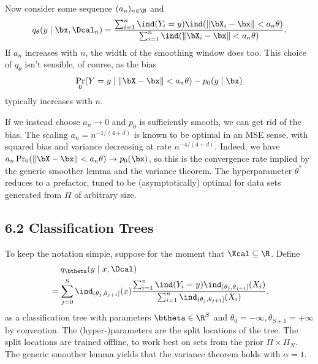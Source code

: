 \documentclass[aspectratio=169,10pt]{beamer}
\newcommand{\currentheading}{\ifx\insertsubsection\empty\insertsection\else\insertsubsection\fi}
\begin{document}
\begin{frame}{\currentheading}
Now consider some sequence $(a_n)_{n \in \N}$ and
\begin{align*}
	q_{\theta}(y \mid \bx, \Dcal_n)
	= \frac{\sum_{i = 1}^n \ind(Y_i = y) \ind(\| \bX_i - \bx\| < a_n\theta)}{\sum_{i = 1}^n \ind(\| \bX_i - \bx\| < a_n\theta)}.
\end{align*}
If $a_n$ increases with $n$, the width of the smoothing window does too. This choice of $q_{\theta}$ isn't sensible, of course, as the bias
\begin{align*}
	\Pr_0(Y = y \mid \| \bX - \bx\| < a_n\theta ) - p_0(y \mid \bx)
\end{align*}
typically increases with $n$.
\end{frame}

\begin{frame}{\currentheading}
If we instead choose $a_n \to 0$ and $p_0$ is sufficiently smooth, we can get rid of the bias. The scaling $a_n = n^{-1/(4 + d)}$ is known to be optimal in an MSE sense, with squared bias and variance decreasing at rate $n^{-4/(4 + d)}$. Indeed, we have $a_n\Pr_0(\| \bX - \bx\| < a_n\theta) \to p_0(\bx)$, so this is the convergence rate implied by the generic smoother lemma and the variance theorem. The hyperparameter $\theta^*$ reduces to a prefactor, tuned to be (asymptotically) optimal for data sets generated from $\Pi$ of arbitrary size.
\end{frame}

\subsection{6.2 Classification Trees}

\begin{frame}{\currentheading}
To keep the notation simple, suppose for the moment that $\Xcal \subseteq \R$. Define
\begin{align*}
	&\quad \; q_{\btheta}(y \mid x, \Dcal) \\
	&= \sum_{j = 0}^{S}  \ind_{(\theta_j, \theta_{j + 1}]}(x)\frac{\sum_{i = 1}^n  \ind(Y_i = y) \ind_{(\theta_j, \theta_{j + 1}]}(X_i)}{\sum_{i = 1}^n   \ind_{(\theta_j, \theta_{j + 1}]}(X_i)},
\end{align*}
as a classification tree with parameters $\btheta \in \R^{S}$ and $\theta_0 = -\infty, \theta_{S + 1} = +\infty$ by convention. The (hyper-)parameters are the split locations of the tree. The split locations are trained offline, to work best on sets from the prior $\Pi \times \Pi_N$. The generic smoother lemma yields that the variance theorem holds with $\alpha = 1$.
\end{frame}
\end{document}

